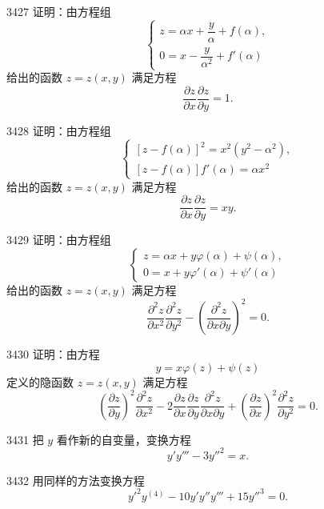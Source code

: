\begin{prob}[M]{3427}
证明：由方程组
\[
\begin{cases}
z = \alpha x + \dfrac{y}{\alpha} + f(\alpha), \\
0 = x - \dfrac{y}{\alpha^2} + f'(\alpha)
\end{cases}
\]
给出的函数 $z = z(x, y)$ 满足方程
\[
\frac{\partial z}{\partial x}\frac{\partial z}{\partial y} = 1.
\]
\end{prob}

\begin{prob}[M]{3428}
证明：由方程组
\[
\begin{cases}
[z - f(\alpha)]^2 = x^2(y^2 - \alpha^2), \\
[z - f(\alpha)] f'(\alpha) = \alpha x^2
\end{cases}
\]
给出的函数 $z = z(x, y)$ 满足方程
\[
\frac{\partial z}{\partial x}\frac{\partial z}{\partial y} = xy.
\]
\end{prob}

\begin{prob}[M]{3429}
证明：由方程组
\[
\begin{cases}
z = \alpha x + y\varphi(\alpha) + \psi(\alpha), \\
0 = x + y\varphi'(\alpha) + \psi'(\alpha)
\end{cases}
\]
给出的函数 $z = z(x, y)$ 满足方程
\[
\frac{\partial^2 z}{\partial x^2}\frac{\partial^2 z}{\partial y^2} - \left(\frac{\partial^2 z}{\partial x\partial y}\right)^2 = 0.
\]
\end{prob}

\begin{prob}[M]{3430}
证明：由方程
\[
y = x\varphi(z) + \psi(z)
\]
定义的隐函数 $z = z(x, y)$ 满足方程
\[
\left(\frac{\partial z}{\partial y}\right)^2 \frac{\partial^2 z}{\partial x^2} - 2\frac{\partial z}{\partial x}\frac{\partial z}{\partial y}\frac{\partial^2 z}{\partial x\partial y} + \left(\frac{\partial z}{\partial x}\right)^2 \frac{\partial^2 z}{\partial y^2} = 0.
\]
\end{prob}


\begin{prob}[S]{3431}
把 $y$ 看作新的自变量，变换方程
\[
y'y''' - 3y''^2 = x.
\]
\end{prob}

\begin{prob}[S]{3432}
用同样的方法变换方程
\[
y'^2 y^{(4)} - 10y'y''y''' + 15y''^3 = 0.
\]
\end{prob}

